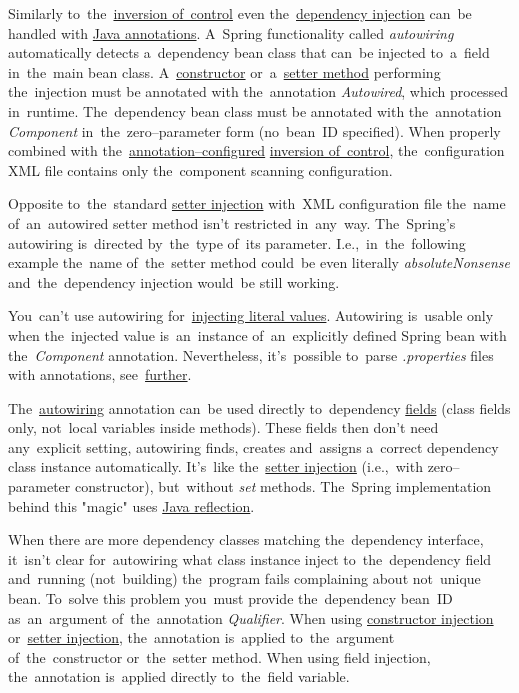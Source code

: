 \label{autowiring}
Similarly to~the~\hyperref[springinversionofcontrol]{inversion of~control} even the~\hyperref[springdependencyinjection]{dependency injection} can~be handled with \hyperref[javaannotation]{Java annotations}. A~Spring functionality called \textit{autowiring} automatically detects a~dependency bean class that can~be injected to~a~field in~the~main bean class. A~\hyperref[constructorinjection]{constructor} or~a~\hyperref[setterinjection]{setter method} performing the~injection must be annotated with the~annotation \textit{Autowired}, which processed in~runtime. The~dependency bean class must be annotated with the~annotation \textit{Component} in~the~zero--parameter form (no~bean~ID specified). When properly combined with the~\hyperref[iocannotations]{annotation--configured} \hyperref[springinversionofcontrol]{inversion of~control}, the~configuration XML file contains only the~component scanning configuration.

\note Opposite to~the~standard \hyperref[setterinjection]{setter injection} with~XML configuration file the~name of~an~autowired setter method isn't restricted in~any~way. The~Spring's autowiring is~directed by~the~type of~its parameter. I.e.,~in~the~following example the~name of~the~setter method could~be even literally \textit{absoluteNonsense} and~the~dependency injection would~be still working.

\warning You~can't use autowiring for~\hyperref[injectingliteralvalues]{injecting literal values}. Autowiring is~usable only when the~injected value is~an~instance of~an~explicitly defined Spring bean with the~\textit{Component} annotation. Nevertheless, it's~possible to~parse \textit{.properties} files with annotations, see~\hyperref[readingpropertiesannotations]{further}.

\label{fieldinjection}
The~\hyperref[autowiring]{autowiring} annotation can~be used directly to~dependency \hyperref[variablefieldproperty]{fields} (class fields only, not~local variables inside methods). These fields then don't need any~explicit setting, autowiring finds, creates and~assigns a~correct dependency class instance automatically. It's~like the~\hyperref[setterinjection]{setter injection} (i.e.,~with zero--parameter constructor), but~without \textit{set} methods. The~Spring implementation behind this "magic" uses \hyperref[reflection]{Java reflection}.

When there are more dependency classes matching the~dependency interface, it~isn't clear for~autowiring what class instance inject to~the~dependency field and~running (not~building) the~program fails complaining about not~unique bean. To~solve this problem you~must provide the~dependency bean~ID as~an~argument of~the~annotation \textit{Qualifier}. When using \hyperref[constructorinjectionautowire]{constructor injection} or~\hyperref[setterinjectionautowire]{setter injection}, the~annotation is~applied to~the~argument of~the~constructor or~the~setter method. When using field injection, the~annotation is~applied directly to~the~field variable.
\newpage

